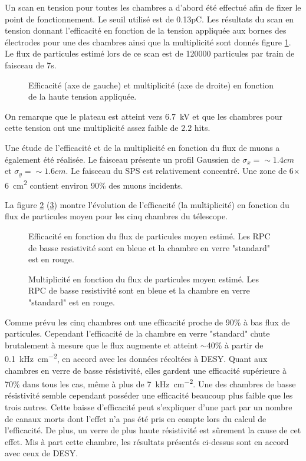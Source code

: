 Un scan en tension pour toutes les chambres a d'abord été effectué afin de fixer le point de fonctionnement. Le seuil utilisé est de 0.13pC. Les résultats du scan en tension donnant l’efficacité en fonction de la tension appliquée aux bornes des électrodes pour une des chambres ainsi que la multiplicité sont donnés figure \ref{HVSPS}. Le flux de particules estimé lors de ce scan est de \num{120000} particules par train de faisceau de 7s.

\begin{figure}[!ht]
	\centering
	\caption{Efficacité (axe de gauche) et multiplicité (axe de droite) en fonction de la haute tension appliquée.}
	\label{HVSPS}
\end{figure}

On remarque que le plateau est atteint vers \SI{6.7}{\kilo\volt} et que les chambres pour cette tension ont une multiplicité assez faible de $2.2$ hits. 

Une étude de l'efficacité et de la multiplicité en fonction du flux de muons a également été réalisée. Le faisceau présente un profil Gaussien de $\sigma_{x}=\sim 1.4cm$ et $\sigma_{y}=\sim 1.6cm$. Le faisceau du SPS est relativement concentré. Une zone de \num{6}$\times$\SI{6}{\square\centi\meter} contient environ 90\% des muons incidents.

La figure \ref{RateSPS} (\ref{MultiplictySPS}) montre l'évolution de l'efficacité (la multiplicité) en fonction du flux de particules moyen pour les cinq chambres du télescope.

\begin{figure}[!ht]
	\centering
	\caption{Efficacité en fonction du flux de particules moyen estimé. Les RPC de basse resistivité sont en bleue et la chambre en verre "standard" est en rouge.}
	\label{RateSPS}
\end{figure}

\begin{figure}[!ht]
	\centering
	\caption{Multiplicité en fonction du flux de particules moyen estimé. Les RPC de basse resistivité sont en bleue et la chambre en verre "standard" est en rouge.}
	\label{MultiplictySPS}
\end{figure}

Comme prévu les cinq chambres ont une efficacité proche de 90\% à bas flux de particules. Cependant l'efficacité de  la chambre en verre "standard" chute brutalement à mesure que le flux augmente et atteint $\sim $40\% à partir de \SI{0.1}{\kilo\hertz\per\square\centi\meter}, en accord avec les données récoltées à DESY. Quant aux chambres en verre de basse résistivité, elles gardent une efficacité supérieure à 70\% dans tous les cas, même à plus de \SI{7}{\kilo\hertz\per\square\centi\meter}. Une des chambres de basse résistivité semble cependant posséder une efficacité beaucoup plus faible que les trois autres. Cette baisse d'efficacité peut s'expliquer d'une part par un nombre de canaux morts dont l'effet n'a pas été pris en compte lors du calcul de l'efficacité. De plus, un verre de plus haute résistivité est sûrement la cause de cet effet. Mis à part cette chambre, les résultats présentés ci-dessus sont en accord avec ceux de DESY.

